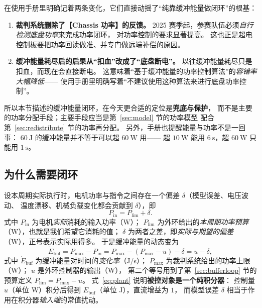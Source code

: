 \documentclass[cn,blue,11pt,device=normal]{elegantnote}
\newcommand{\Pin}{P_{\mathrm{in}}{}}
\newcommand{\Ebuf}{E_{\mathrm{buf}}{}}
\newcommand{\Plim}{P_{\mathrm{lim}}{}}
\newcommand{\Pmax}{P_{\max}{}}
\newcommand{\fref}[1]{式~\eqref{#1}}
\begin{document}
\begin{note}
在使用手册里明确记着两条变化，它们直接动摇了“纯靠缓冲能量做闭环”的根基：
\begin{enumerate}
  \item \textbf{裁判系统删除了【Chassis 功率】的反馈。}
  2025 赛季起，参赛队伍必须\emph{自行检测底盘功率}来完成功率闭环，
  对功率控制的要求显著提高。
  这也正是超电控制板要把功率回读做准、并专门做远端补偿的原因。
  \item \textbf{缓冲能量耗尽后的后果从“扣血”改成了“底盘断电”。}
  以往缓冲能量耗尽只是扣血，而现在会直接断电。
  这意味着“基于缓冲能量的功率控制算法”的\emph{容错率大幅降低}——
  使用手册里明确写着“不建议使用这种算法来进行底盘功率控制”。
\end{enumerate}
所以本节描述的缓冲能量闭环，在今天更合适的定位是\textbf{兜底与保护}，
而不是主要的功率分配手段；主要手段应当是第~\ref{sec:model} 节的功率模型
配合第~\ref{sec:redistribute} 节的功率再分配。
另外，手册也提醒能量与功率不是一回事：
$60\ \mathrm{J}$ 的缓冲能量并不等于可以超 $60\ \mathrm{W}$ 用——
超 $10\ \mathrm{W}$ 能用 $6\ \mathrm{s}$，超 $60\ \mathrm{W}$ 只能用 $1\ \mathrm{s}$。
\end{note}

\subsection{为什么需要闭环}

设本周期实际执行时，电机功率与指令之间存在一个偏差 $\delta$（模型误差、电压波动、
温度漂移、机械负载变化都会贡献到 $\delta$），即
\begin{equation}
  \Pin = \Plim + \delta .
\end{equation}
式中 $\Pin$ 为电机\emph{实际}消耗的输入功率（W）；
$\Plim$ 为外环给出的\emph{本周期功率预算}（W），也就是我们希望它消耗的值；
$\delta$ 为两者之差，即\emph{实际与期望的偏差}（W），正号表示实际用得多。
于是缓冲能量的动态变为
\begin{equation}\label{eq:plant}
  \dot\Ebuf = \Pmax - \Pin = \Pmax - (\Pmax - u) - \delta = u - \delta,
\end{equation}
式中 $\dot\Ebuf$ 为缓冲能量对时间的\emph{变化率}（J/s）；
$\Pmax$ 为裁判系统给出的功率上限（W）；
$u$ 是外环控制器的输出（W），
第二个等号用到了第~\ref{sec:bufferloop} 节的预算定义 $\Plim=\Pmax-u$。
\fref{eq:plant} 说明\textbf{被控对象是一个纯积分器}：
控制量 $u$（单位 W）积分后得到 $\Ebuf$（单位 J），直流增益为 $1$，
而模型误差 $\delta$ 相当于作用在积分器\emph{输入端}的常值扰动。
\end{document}
